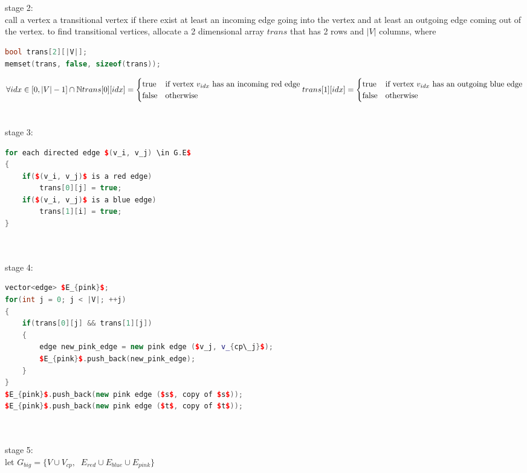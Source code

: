 \documentclass[12pt,border=4pt,multi]{article} %
\begin{document}
\\
\\
stage 2:\\
call a vertex a transitional vertex if there exist at least an incoming  edge going into the vertex and at least an outgoing edge coming out of the vertex. to find transitional vertices, allocate a 2 dimensional array $trans$ that has 2 rows and $|V|$ columns, where 
\begin{lstlisting}[language = c++]
bool trans[2][|V|];
memset(trans, false, sizeof(trans));
\end{lstlisting}
$\forall idx \in [0, |V| - 1] \cap \mathbb{N}\\
trans[0][idx] = 
\begin{cases}
\text{true} & \text{if vertex } v_{idx} \text{ has an incoming red edge}\\
\text{false} & \text{otherwise}\\
\end{cases}\\
trans[1][idx] = 
\begin{cases}
\text{true} & \text{if vertex } v_{idx} \text{ has an outgoing blue edge}\\
\text{false} & \text{otherwise}\\
\end{cases}$\\
\\
\\
stage 3:
\begin{lstlisting}[language = c++, mathescape = true]
for each directed edge $(v_i, v_j) \in G.E$
{
    if($(v_i, v_j)$ is a red edge)
        trans[0][j] = true;
    if($(v_i, v_j)$ is a blue edge)
        trans[1][i] = true;
}
\end{lstlisting}
\leavevmode
\\
\\
stage 4:
\begin{lstlisting}[language = c++, mathescape = true]
vector<edge> $E_{pink}$;
for(int j = 0; j < |V|; ++j)
{
    if(trans[0][j] && trans[1][j])
    {
        edge new_pink_edge = new pink edge ($v_j, v_{cp\_j}$);
        $E_{pink}$.push_back(new_pink_edge);
    }
}
$E_{pink}$.push_back(new pink edge ($s$, copy of $s$));
$E_{pink}$.push_back(new pink edge ($t$, copy of $t$));
\end{lstlisting}
\leavevmode
\\
\\
stage 5:\\
let $G_{big} = \{V \cup V_{cp},\;\; E_{red} \cup E_{blue} \cup E_{pink}\}$\\
\end{document}
